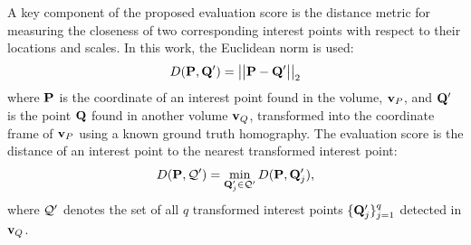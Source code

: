 A key component of the proposed evaluation score is the distance metric for measuring the closeness of two corresponding interest points with respect to their locations and scales. In this work, the Euclidean norm is used:
\begin{equation}
	D(\mathbf{P}, \mathbf{Q}') = \big|\big|\mathbf{P} - \mathbf{Q}'\big|\big|_{2}
	\label{eqn/eval/matchdistance}
\end{equation}
where $\mathbf{P}$ is the coordinate of an interest point found in the volume, $\mathbf{v}_P$, and $\mathbf{Q}'$ is the point $\mathbf{Q}$ found in another volume $\mathbf{v}_Q$, transformed into the coordinate frame of $\mathbf{v}_P$ using a known ground truth homography. The evaluation score is the distance of an interest point to the nearest transformed interest point:
\begin{equation}
D(\mathbf{P}, \mathcal{Q}') = \min_{\mathbf{Q}'_j \in \mathcal{Q}'}D(\mathbf{P}, \mathbf{Q}'_j),
\label{eqn/eval/metricNN}
\end{equation}
where $\mathcal{Q}'$ denotes the set of all $q$ transformed interest points $\{\mathbf{Q}'_j\}_{j=1}^{q}$ detected in $\mathbf{v}_Q$.

